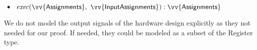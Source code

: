 \begin{itemize}
\item $\concexecution (\vv{\textsf{Assignments}},~
  \vv{\textsf{InputAssignments}}) : \vv{\textsf{Assignments}}$
\end{itemize}
       
We do not model the output signals of the hardware design explicitly as they not needed
for our proof. If needed, they could be modeled as a subset of the \textsf{Register} type.



